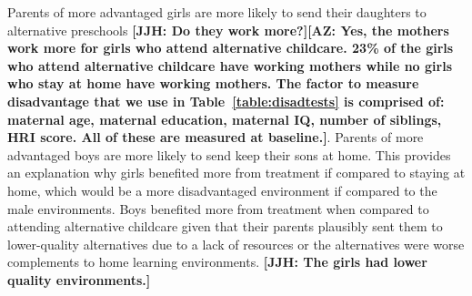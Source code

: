 Parents of more advantaged girls are more likely to send their daughters to alternative preschools \textbf{[JJH: Do they work more?][AZ: Yes, the mothers work more for girls who attend alternative childcare. 23\% of the girls who attend alternative childcare have working mothers while no girls who stay at home have working mothers. The factor to measure disadvantage that we use in Table~\ref{table:disadtests} is comprised of: maternal age, maternal education, maternal IQ, number of siblings, HRI score. All of these are measured at baseline.]}. Parents of more advantaged boys are more likely to send keep their sons at home. This provides an explanation why girls benefited more from treatment if compared to staying at home, which would be a more disadvantaged environment if compared to the male environments. Boys benefited more from treatment when compared to attending alternative childcare given that their parents plausibly sent them to lower-quality alternatives due to a lack of resources or the alternatives were worse complements to home learning environments. \textbf{[JJH: The girls had lower quality environments.]}











